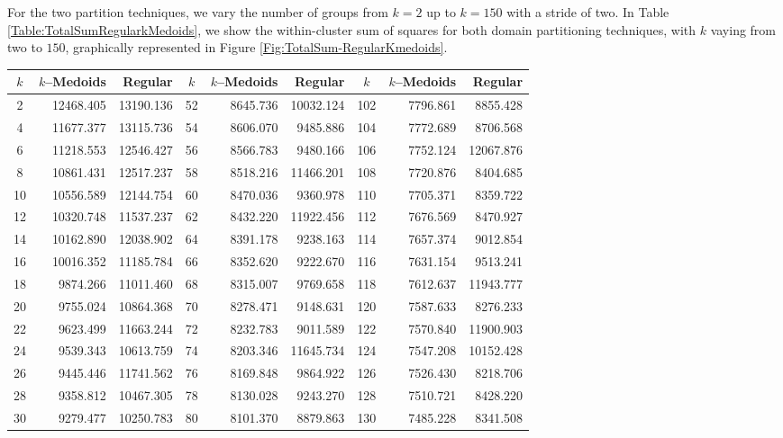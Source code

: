 For the two partition techniques, we vary the number of groups from $k=2$ up to $k=150$ with a stride of two. In Table \ref{Table:TotalSumRegularkMedoids}, we show the within-cluster sum of squares for both domain partitioning techniques, with $k$ vaying from two to $150$, graphically represented in Figure \ref{Fig:TotalSum-RegularKmedoids}. 
\begin{table}[h]
	\centering
	\tiny
	\begin{tabular}{|c|r|r|c|r|r|c|r|r|}
		\hline
		$k$  & $k$--Medoids & Regular & $k$ & $k$--Medoids & Regular & $k$ & $k$--Medoids & Regular \\ \hline
		2  & 12468.405 & 13190.136 &  52 & 8645.736 & 10032.124 & 102 & 7796.861 &  8855.428 \\
		4  & 11677.377 & 13115.736 &  54 & 8606.070 &  9485.886 & 104 & 7772.689 &  8706.568 \\
		6  & 11218.553 & 12546.427 &  56 & 8566.783 &  9480.166 & 106 & 7752.124 & 12067.876 \\
		8  & 10861.431 & 12517.237 &  58 & 8518.216 & 11466.201 & 108 & 7720.876 &  8404.685 \\
		10 & 10556.589 & 12144.754 &  60 & 8470.036 &  9360.978 & 110 & 7705.371 &  8359.722 \\
		12 & 10320.748 & 11537.237 &  62 & 8432.220 & 11922.456 & 112 & 7676.569 &  8470.927 \\
		14 & 10162.890 & 12038.902 &  64 & 8391.178 &  9238.163 & 114 & 7657.374 &  9012.854 \\
		16 & 10016.352 & 11185.784 &  66 & 8352.620 &  9222.670 & 116 & 7631.154 &  9513.241 \\
		18 &  9874.266 & 11011.460 &  68 & 8315.007 &  9769.658 & 118 & 7612.637 & 11943.777 \\
		20 &  9755.024 & 10864.368 &  70 & 8278.471 &  9148.631 & 120 & 7587.633 &  8276.233 \\
		22 &  9623.499 & 11663.244 &  72 & 8232.783 &  9011.589 & 122 & 7570.840 & 11900.903 \\
		24 &  9539.343 & 10613.759 &  74 & 8203.346 & 11645.734 & 124 & 7547.208 & 10152.428 \\
		26 &  9445.446 & 11741.562 &  76 & 8169.848 &  9864.922 & 126 & 7526.430 &  8218.706 \\
		28 &  9358.812 & 10467.305 &  78 & 8130.028 &  9243.270 & 128 & 7510.721 &  8428.220 \\
		30 &  9279.477 & 10250.783 &  80 & 8101.370 &  8879.863 & 130 & 7485.228 &  8341.508 \\

\end{tabular}
\end{table}
